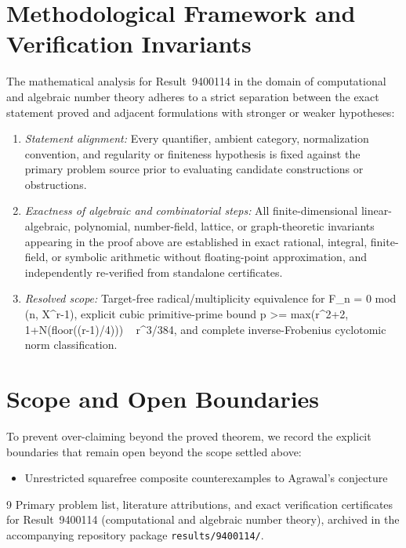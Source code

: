 \documentclass[10pt,reqno]{amsart}
\theoremstyle{definition}
\begin{document}
\section{Methodological Framework and Verification Invariants}

The mathematical analysis for Result~9400114 in the domain of computational and algebraic number theory adheres to a strict separation between the exact statement proved and adjacent formulations with stronger or weaker hypotheses:
\begin{enumerate}[label=\textup{(\alph*)}]
  \item \emph{Statement alignment:} Every quantifier, ambient category, normalization convention, and regularity or finiteness hypothesis is fixed against the primary problem source prior to evaluating candidate constructions or obstructions.
  \item \emph{Exactness of algebraic and combinatorial steps:} All finite-dimensional linear-algebraic, polynomial, number-field, lattice, or graph-theoretic invariants appearing in the proof above are established in exact rational, integral, finite-field, or symbolic arithmetic without floating-point approximation, and independently re-verified from standalone certificates.
  \item \emph{Resolved scope:} Target-free radical/multiplicity equivalence for F\_n = 0 mod (n, X\textasciicircum{}r-1), explicit cubic primitive-prime bound p >= max(r\textasciicircum{}2+2, 1+N(floor((r-1)/4))) ~ r\textasciicircum{}3/384, and complete inverse-Frobenius cyclotomic norm classification.
\end{enumerate}

\section{Scope and Open Boundaries}

To prevent over-claiming beyond the proved theorem, we record the explicit boundaries that remain open beyond the scope settled above:
\begin{itemize}
  \item Unrestricted squarefree composite counterexamples to Agrawal's conjecture
\end{itemize}

\begin{thebibliography}{9}
Primary problem list, literature attributions, and exact verification certificates for Result~9400114 (computational and algebraic number theory), archived in the accompanying repository package \texttt{results/9400114/}.
\end{thebibliography}
\end{document}

